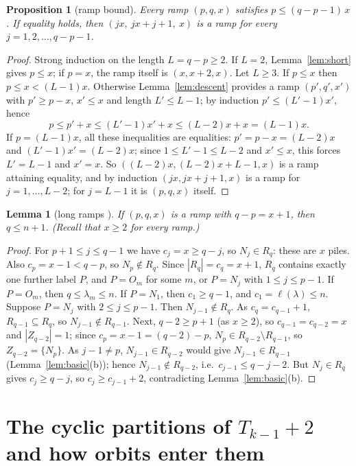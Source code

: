 \documentclass[11pt]{article}
\newtheorem{lemma}[theorem]{Lemma}
\newtheorem{proposition}[theorem]{Proposition}
\theoremstyle{definition}
\newcommand{\R}{R}
\renewcommand{\le}{\leqslant}
\renewcommand{\ge}{\geqslant}
\begin{document}
\begin{proposition}[ramp bound]\label{prop:rampbound}
Every ramp $(p,q,x)$ satisfies $p\le(q-p-1)\,x$.  If equality holds, then $(jx,\ jx+j+1,\ x)$ is a ramp
for every $j=1,2,\dots,q-p-1$.
\end{proposition}
\begin{proof}
Strong induction on the length $L=q-p\ge2$.  If $L=2$, Lemma~\ref{lem:short} gives $p\le x$; if $p=x$, the
ramp itself is $(x,x+2,x)$.  Let $L\ge3$.  If $p\le x$ then $p\le x<(L-1)x$.  Otherwise
Lemma~\ref{lem:descent} provides a ramp $(p',q',x')$ with $p'\ge p-x$, $x'\le x$ and length $L'\le L-1$; by
induction $p'\le(L'-1)x'$, hence
\[p\le p'+x\le(L'-1)x'+x\le(L-2)x+x=(L-1)x .\]
If $p=(L-1)x$, all these inequalities are equalities: $p'=p-x=(L-2)x$ and $(L'-1)x'=(L-2)x$; since
$1\le L'-1\le L-2$ and $x'\le x$, this forces $L'=L-1$ and $x'=x$.  So $((L-2)x,(L-2)x+L-1,x)$ is a ramp
attaining equality, and by induction $(jx,jx+j+1,x)$ is a ramp for $j=1,\dots,L-2$; for $j=L-1$ it is
$(p,q,x)$ itself.
\end{proof}

\begin{lemma}[long ramps {\cite[Lemma~3.4]{GH}}]\label{lem:long}
If $(p,q,x)$ is a ramp with $q-p=x+1$, then $q\le n+1$.  (Recall that $x\ge2$ for every ramp.)
\end{lemma}
\begin{proof}
For $p+1\le j\le q-1$ we have $c_j=x\ge q-j$, so $N_j\in \R_q$: these are $x$ piles.  Also
$c_p=x-1<q-p$, so $N_p\notin \R_q$.  Since $|\R_q|=c_q=x+1$, $\R_q$ contains exactly one further label $P$,
and $P=O_m$ for some $m$, or $P=N_j$ with $1\le j\le p-1$.
If $P=O_m$, then $q\le\lambda_m\le n$.  If $P=N_1$, then $c_1\ge q-1$, and $c_1=\ell(\lambda)\le n$.
Suppose $P=N_j$ with $2\le j\le p-1$.  Then $N_{j-1}\notin \R_q$.  As $c_q=c_{q-1}+1$, $\R_{q-1}\subseteq \R_q$, so
$N_{j-1}\notin \R_{q-1}$.  Next, $q-2\ge p+1$ (as $x\ge2$), so $c_{q-1}=c_{q-2}=x$ and $|Z_{q-2}|=1$; since
$c_p=x-1=(q-2)-p$, $N_p\in \R_{q-2}\setminus \R_{q-1}$, so $Z_{q-2}=\{N_p\}$.  As $j-1\ne p$, $N_{j-1}\in \R_{q-2}$ would give
$N_{j-1}\in \R_{q-1}$ (Lemma~\ref{lem:basic}(b)); hence $N_{j-1}\notin \R_{q-2}$, i.e.\ $c_{j-1}\le q-j-2$.  But
$N_j\in \R_q$ gives $c_j\ge q-j$, so $c_j\ge c_{j-1}+2$, contradicting Lemma~\ref{lem:basic}(b).
\end{proof}

\section{The cyclic partitions of $T_{k-1}+2$ and how orbits enter them}\label{sec:entry2}
\end{document}
